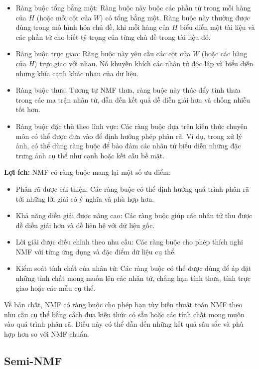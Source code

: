 \begin{itemize}
\item
  Ràng buộc tổng bằng một: Ràng buộc này buộc các phần tử trong mỗi hàng của \(H\) (hoặc mỗi cột của \(W\)) có tổng bằng một. Ràng buộc này thường được dùng trong mô hình hóa chủ đề, khi mỗi hàng của \(H\) biểu diễn một tài liệu và các phần tử cho biết tỷ trọng của từng chủ đề trong tài liệu đó.
\item
  Ràng buộc trực giao: Ràng buộc này yêu cầu các cột của \(W\) (hoặc các hàng của \(H\)) trực giao với nhau. Nó khuyến khích các nhân tử độc lập và biểu diễn những khía cạnh khác nhau của dữ liệu.
\item
  Ràng buộc thưa: Tương tự NMF thưa, ràng buộc này thúc đẩy tính thưa trong các ma trận nhân tử, dẫn đến kết quả dễ diễn giải hơn và chống nhiễu tốt hơn.
\item
  Ràng buộc đặc thù theo lĩnh vực: Các ràng buộc dựa trên kiến thức chuyên môn có thể được đưa vào để định hướng phép phân rã. Ví dụ, trong xử lý ảnh, có thể dùng ràng buộc để bảo đảm các nhân tử biểu diễn những đặc trưng ảnh cụ thể như cạnh hoặc kết cấu bề mặt.
\end{itemize}

\textbf{Lợi ích:} NMF có ràng buộc mang lại một số ưu điểm:

\begin{itemize}
\item
  Phân rã được cải thiện: Các ràng buộc có thể định hướng quá trình phân rã tới những lời giải có ý nghĩa và phù hợp hơn.
\item
  Khả năng diễn giải được nâng cao: Các ràng buộc giúp các nhân tử thu được dễ diễn giải hơn và dễ liên hệ với dữ liệu gốc.
\item
  Lời giải được điều chỉnh theo nhu cầu: Các ràng buộc cho phép thích nghi NMF với từng ứng dụng và đặc điểm dữ liệu cụ thể.
\item
  Kiểm soát tính chất của nhân tử: Các ràng buộc có thể được dùng để áp đặt những tính chất mong muốn lên các nhân tử, chẳng hạn tính thưa, tính trực giao hoặc các mẫu cụ thể.
\end{itemize}

Về bản chất, NMF có ràng buộc cho phép bạn tùy biến thuật toán NMF theo nhu cầu cụ thể bằng cách đưa kiến thức có sẵn hoặc các tính chất mong muốn vào quá trình phân rã. Điều này có thể dẫn đến những kết quả sâu sắc và phù hợp hơn so với NMF chuẩn.

\subsection{Semi-NMF}

